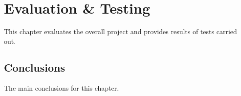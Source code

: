 \chapter{Evaluation \& Testing}\label{ch:Evaluation}

This chapter evaluates the overall project and provides results of tests carried out.

\section{Conclusions}

The main conclusions for this chapter.


